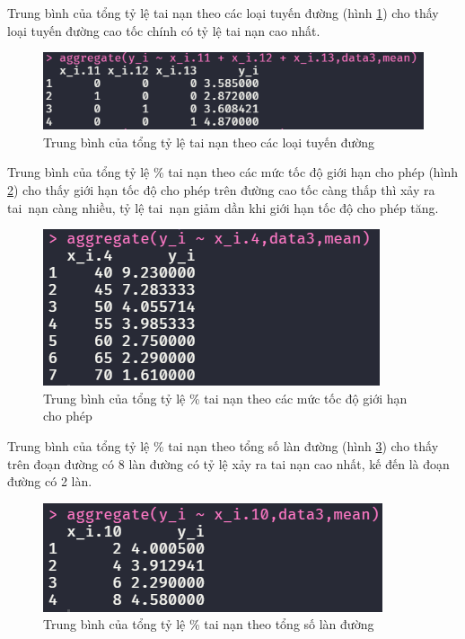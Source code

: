 Trung bình của tổng tỷ lệ tai nạn theo các loại tuyến đường (hình \ref{fig-b3:aggregate-x11-13}) cho thấy loại tuyến đường cao tốc chính có tỷ lệ tai nạn cao nhất.
\begin{figure}[H]
	\centering
	\includegraphics[width=0.7\linewidth]{images/B3/aggregate-x11-13}
	\caption{Trung bình của tổng tỷ lệ tai nạn theo các loại tuyến đường}
	\label{fig-b3:aggregate-x11-13}
\end{figure}

Trung bình của tổng tỷ lệ \% tai nạn theo các mức tốc độ giới hạn cho phép (hình \ref{fig-b3:aggregate-x4}) cho thấy giới hạn tốc độ cho phép trên đường cao tốc càng thấp thì xảy ra tai~nạn càng nhiều, tỷ lệ tai~nạn giảm dần khi giới hạn tốc độ cho phép tăng.
\begin{figure}[H]
	\centering
	\includegraphics[width=0.45\linewidth]{images/B3/aggregate-x4}
	\caption{Trung bình của tổng tỷ lệ \% tai nạn theo các mức tốc độ giới hạn cho phép}
	\label{fig-b3:aggregate-x4}
\end{figure}

Trung bình của tổng tỷ lệ \% tai nạn theo tổng số làn đường (hình \ref{fig-b3:aggregate-x10}) cho thấy  trên đoạn đường có 8 làn đường có tỷ lệ xảy ra tai nạn cao nhất, kế đến là đoạn đường có 2 làn.
\begin{figure}[H]
	\centering
	\includegraphics[width=0.45\linewidth]{images/B3/aggregate-x10}
	\caption{Trung bình của tổng tỷ lệ \% tai nạn theo tổng số làn đường}
	\label{fig-b3:aggregate-x10}
\end{figure}

